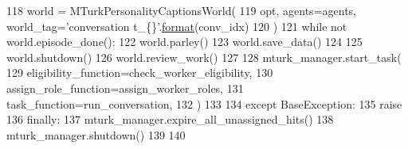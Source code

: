 \begin{DoxyCode}
118             world = MTurkPersonalityCaptionsWorld(
119                 opt, agents=agents, world\_tag=\textcolor{stringliteral}{'conversation t\_\{\}'}.\hyperlink{namespaceparlai_1_1chat__service_1_1services_1_1messenger_1_1shared__utils_a32e2e2022b824fbaf80c747160b52a76}{format}(conv\_idx)
120             )
121             \textcolor{keywordflow}{while} \textcolor{keywordflow}{not} world.episode\_done():
122                 world.parley()
123             world.save\_data()
124 
125             world.shutdown()
126             world.review\_work()
127 
128         mturk\_manager.start\_task(
129             eligibility\_function=check\_worker\_eligibility,
130             assign\_role\_function=assign\_worker\_roles,
131             task\_function=run\_conversation,
132         )
133 
134     \textcolor{keywordflow}{except} BaseException:
135         \textcolor{keywordflow}{raise}
136     \textcolor{keywordflow}{finally}:
137         mturk\_manager.expire\_all\_unassigned\_hits()
138         mturk\_manager.shutdown()
139 
140 
\end{DoxyCode}
